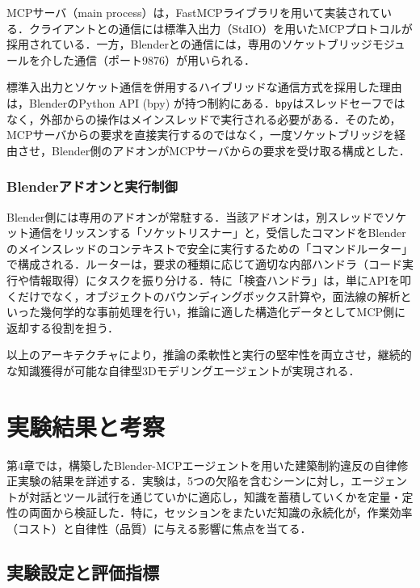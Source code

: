 \documentclass[dvipdfmx, a4paper, 9pt]{deimj}
\begin{document}
MCPサーバ（main process）は，FastMCPライブラリを用いて実装されている．クライアントとの通信には標準入出力（StdIO）を用いたMCPプロトコルが採用されている．一方，Blenderとの通信には，専用のソケットブリッジモジュールを介した通信（ポート9876）が用いられる．

標準入出力とソケット通信を併用するハイブリッドな通信方式を採用した理由は，BlenderのPython API (bpy) が持つ制約にある．\texttt{bpy}はスレッドセーフではなく，外部からの操作はメインスレッドで実行される必要がある．そのため，MCPサーバからの要求を直接実行するのではなく，一度ソケットブリッジを経由させ，Blender側のアドオンがMCPサーバからの要求を受け取る構成とした．

\subsubsection{Blenderアドオンと実行制御}

Blender側には専用のアドオンが常駐する．当該アドオンは，別スレッドでソケット通信をリッスンする「ソケットリスナー」と，受信したコマンドをBlenderのメインスレッドのコンテキストで安全に実行するための「コマンドルーター」で構成される．ルーターは，要求の種類に応じて適切な内部ハンドラ（コード実行や情報取得）にタスクを振り分ける．特に「検査ハンドラ」は，単にAPIを叩くだけでなく，オブジェクトのバウンディングボックス計算や，面法線の解析といった幾何学的な事前処理を行い，推論に適した構造化データとしてMCP側に返却する役割を担う．

以上のアーキテクチャにより，推論の柔軟性と実行の堅牢性を両立させ，継続的な知識獲得が可能な自律型3Dモデリングエージェントが実現される．

\section{実験結果と考察}

第4章では，構築したBlender-MCPエージェントを用いた建築制約違反の自律修正実験の結果を詳述する．実験は，5つの欠陥を含むシーンに対し，エージェントが対話とツール試行を通じていかに適応し，知識を蓄積していくかを定量・定性の両面から検証した．特に，セッションをまたいだ知識の永続化が，作業効率（コスト）と自律性（品質）に与える影響に焦点を当てる．

\subsection{実験設定と評価指標}
\end{document}
